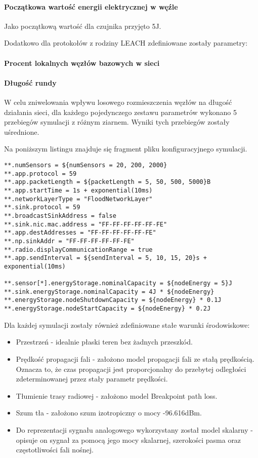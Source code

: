 \paragraph{Początkowa wartość energii elektrycznej w węźle}
Jako początkową wartość dla czujnika przyjęto 5J.

Dodatkowo dla protokołów z rodziny LEACH zdefiniowane zostały parametry:
\paragraph{Procent lokalnych węzłów bazowych w sieci}
\paragraph{Długość rundy}

W celu zniwelowania wpływu losowego rozmieszczenia węzłów na długość działania sieci, dla każdego pojedynczego zestawu parametrów wykonano 5 przebiegów symulacji z różnym ziarnem. Wyniki tych przebiegów zostały uśrednione.

Na poniższym listingu znajduje się fragment pliku konfiguracyjnego symulacji.
\begin{verbatim}
**.numSensors = ${numSensors = 20, 200, 2000}
**.app.protocol = 59
**.app.packetLength = ${packetLength = 5, 50, 500, 5000}B
**.app.startTime = 1s + exponential(10ms)
**.networkLayerType = "FloodNetworkLayer"
**.sink.protocol = 59
**.broadcastSinkAddress = false
**.sink.nic.mac.address = "FF-FF-FF-FF-FF-FE"
**.app.destAddresses = "FF-FF-FF-FF-FF-FE"
**.np.sinkAddr = "FF-FF-FF-FF-FF-FE"
**.radio.displayCommunicationRange = true
**.app.sendInterval = ${sendInterval = 5, 10, 15, 20}s + exponential(10ms)

**.sensor[*].energyStorage.nominalCapacity = ${nodeEnergy = 5}J
**.sink.energyStorage.nominalCapacity = 4J * ${nodeEnergy}
**.energyStorage.nodeShutdownCapacity = ${nodeEnergy} * 0.1J
**.energyStorage.nodeStartCapacity = ${nodeEnergy} * 0.2J
\end{verbatim}

Dla każdej symulacji zostały również zdefiniowane stałe warunki środowiskowe:
\begin{itemize}
	\item Przestrzeń - idealnie płaski teren bez żadnych przeszkód.
	\item Prędkość propagacji fali - założono model propagacji fali ze stałą prędkością. Oznacza to, że czas propagacji jest proporcjonalny do przebytej odległości zdeterminowanej przez stały parametr prędkości.
	\item Tłumienie trasy radiowej - założono model Breakpoint path loss.
	\item Szum tła - założono szum izotropiczny o mocy -96.616dBm.
	\item Do reprezentacji sygnału analogowego wykorzystany został model skalarny - opisuje on sygnał za pomocą jego mocy skalarnej, szerokości pasma oraz częstotliwości fali nośnej.
\end{itemize}